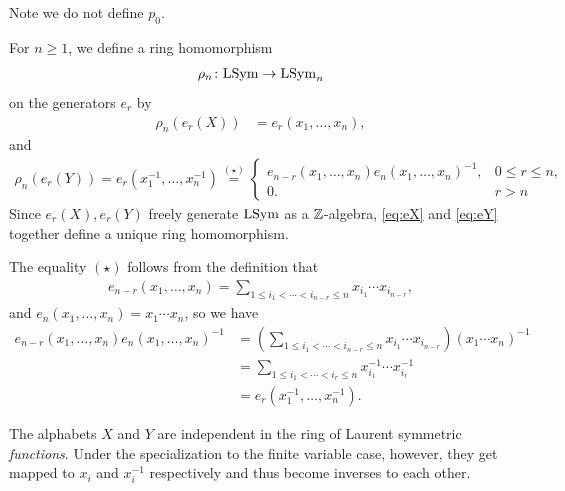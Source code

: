 \documentclass[11pt]{amsart}
\begin{document}
Note we do not define \(p_0\).



\begin{defin}\label{def:rho}
    For $n \geq 1$, we define a ring homomorphism
    \begin{align*}
        \rho_n \colon \mathrm{LSym} \rightarrow \mathrm{LSym}_n
    \end{align*} 
    on the generators $e_r$ by
    \begin{align}
        \rho_n(e_r(X)) &= e_r(x_1, \dots , x_n), \label{eq:eX}
    \end{align}
    and
    \begin{align}
        \rho_n (e_r(Y)) = e_r(x_1^{-1}, \dots, x_n^{-1} ) \overset{(\star)}{=}  \begin{cases}
            e_{n-r}(x_1,\dots,x_n)e_n(x_1,\dots,x_n)^{-1},
                & 0\leq r\leq n,\\
            0. & r>n
        \end{cases} \label{eq:eY}
        \end{align}
        Since $e_r(X), e_r(Y)$ freely generate $\mathrm{LSym}$ as a $\mathbb{Z}$-algebra, \cref{eq:eX} and \cref{eq:eY} together define a unique ring homomorphism. 
\end{defin}

\begin{rem}
    The equality $(\star)$ follows from the definition that 
    \begin{align*}
        e_{n-r}(x_1, \dots, x_n)=\displaystyle\sum_{1 \leq i_1 < \cdots < i_{n-r} \leq n}x_{i_1}\cdots x_{i_{n-r}},
    \end{align*}
    and $e_n(x_1, \dots, x_n)=x_1\cdots x_n$, so we have
    \begin{align*}
        e_{n-r}(x_1,\dots,x_n)e_n(x_1,\dots,x_n)^{-1} 
        &= \left( \sum_{1 \leq i_1 < \cdots < i_{n-r} \leq n}x_{i_1}\cdots x_{i_{n-r}} \right)(x_1\cdots x_n)^{-1} \\
        &= \sum_{1 \leq i_1 < \cdots <  i_{r}\leq n} x_{i_1}^{-1}\cdots x_{i_r}^{-1} \\
        &= e_r(x_1^{-1}, \dots, x_n^{-1}).
    \end{align*}
\end{rem}

The alphabets $X$ and $Y$ are independent in the ring of Laurent symmetric \textit{functions}. Under the specialization to the finite variable case, however, they get mapped to $x_i$ and $x_i^{-1}$ respectively and thus become inverses to each other.
\end{document}
